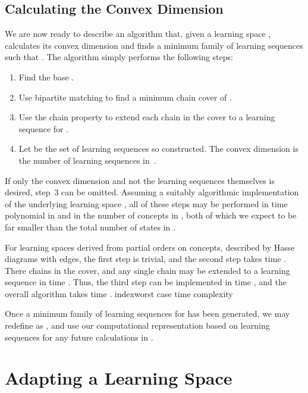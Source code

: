 \documentclass[11pt]{llncs}
\begin{document}
{\subsection{Calculating the Convex Dimension}

We are now ready to describe an algorithm that, given a learning space , calculates its convex dimension and finds a minimum family  of learning sequences such that . The algorithm simply performs the following steps:

\begin{enumerate}
\item Find the base .
\item Use bipartite matching to find a minimum chain cover of .
\item Use the chain property to extend each chain in the cover to a learning sequence for .
\item Let  be the set of learning sequences so constructed. The convex dimension is the number of learning sequences in~.
\end{enumerate}

If only the convex dimension and not the learning sequences themselves is desired, step~3 can be omitted.
Assuming a suitably algorithmic implementation of the underlying learning space , all of these steps may be performed in time polynomial in  and in the number of concepts in ,
both of which we expect to be far smaller than the total number of states in .

For learning spaces derived from partial orders on  concepts, described by Hasse diagrams with  edges, the first step is trivial, and the second step takes time . There  chains in the cover,
and any single chain may be extended to a learning sequence in time . Thus, the third step can be implemented in time , and the overall algorithm takes time .
index{worst case time complexity}

Once a minimum family  of learning sequences for  has been generated, we may redefine  as , and use our computational representation based on learning sequences for any future calculations in .

\section{Adapting a Learning Space}

}
\end{document}
